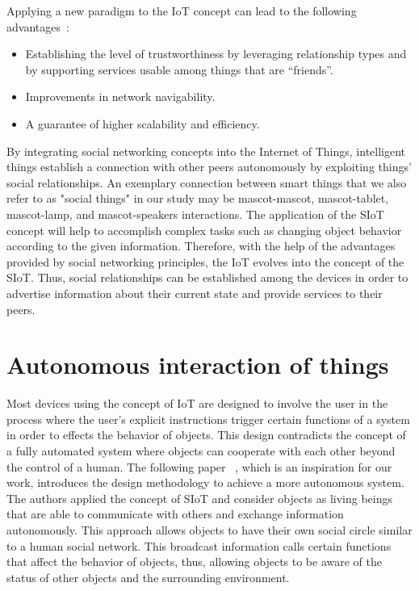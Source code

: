 Applying a new paradigm to the IoT concept can lead to the following advantages~\cite{atzori2011siot, atzori2012social}:
\begin{itemize}
  \item Establishing the level of trustworthiness by leveraging relationship types and by
        supporting services usable among things that are “friends”.
  \item Improvements in network navigability.
  \item A guarantee of higher scalability and efficiency.
\end{itemize}

By integrating social networking concepts into the Internet of Things, intelligent things
establish a connection with other peers autonomously by exploiting things' social relationships.
An exemplary connection between smart things that we also refer to as "social things" in our
study may be mascot-mascot, mascot-tablet, mascot-lamp, and mascot-speakers interactions.
The application of the SIoT concept will help to accomplish complex tasks such as changing
object behavior according to the given information.
Therefore, with the help of the advantages provided by social networking principles,
the IoT evolves into the concept of the SIoT\@.
Thus, social relationships can be established among
the devices in order to advertise information about their current state and provide services to their peers.

\section{Autonomous interaction of things}
\label{sec:Autonomous interaction of things}
Most devices using the concept of IoT are designed to involve the user in the process
where the user's explicit instructions trigger certain functions of a system in order to effects the behavior of objects.
This design contradicts the concept of a fully automated system where objects
can cooperate with each other beyond the control of a human.
The following paper ~\cite{okada2016autonomous}, which is an inspiration for our work,
introduces the design methodology to achieve a more autonomous system.
The authors applied the concept of SIoT and consider objects as living beings that are
able to communicate with others and exchange information autonomously.
This approach allows objects to have their own social circle similar to a human social network.
This broadcast information calls certain functions that affect the behavior of objects,
thus, allowing objects to be aware of the status of other objects and the surrounding environment.

